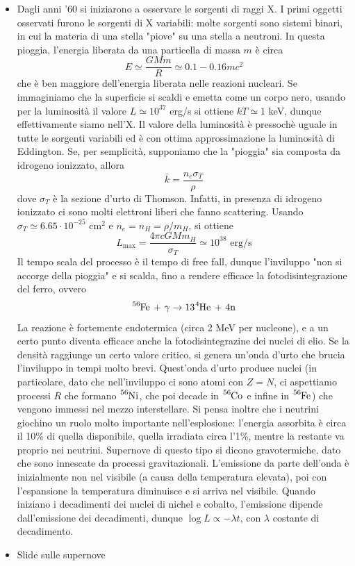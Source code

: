 \documentclass[a4paper,11pt]{article}
\theoremstyle{theorem}
\theoremstyle{definition}
\begin{document}
\begin{itemize}
		\item Dagli anni '60 si iniziarono a osservare le sorgenti di raggi X. I primi oggetti osservati furono le sorgenti di X variabili: molte sorgenti sono sistemi binari, in cui la materia di una stella "piove" su una stella a neutroni. In questa pioggia, l'energia liberata da una particella di massa $m$ è circa
		\[E\simeq\frac{GMm}{R}\simeq 0.1-0.16 mc^2\]
		che è ben maggiore dell'energia liberata nelle reazioni nucleari. Se immaginiamo che la superficie si scaldi e emetta come un corpo nero, usando per la luminosità il valore $L\simeq 10^{37}$ erg/s si ottiene $kT\simeq 1$ keV, dunque effettivamente siamo nell'X. Il valore della luminosità è pressochè uguale in tutte le sorgenti variabili ed è con ottima approssimazione la luminosità di Eddington. Se, per semplicità, supponiamo che la "pioggia" sia composta da idrogeno ionizzato, allora
		\[\bar{k}=\frac{n_e\sigma_T}{\rho}\]
		dove $\sigma_T$ è la sezione d'urto di Thomson. Infatti, in presenza di idrogeno ionizzato ci sono molti elettroni liberi che fanno scattering. Usando $\sigma_T\simeq6.65\cdot10^{-25}$ cm$^2$ e $n_e=n_H=\rho/m_H$, si ottiene
		\[L_\textrm{max}=\frac{4\pi cGMm_H}{\sigma_T}\simeq10^{38}\textrm{ erg/s}\]
		Il tempo scala del processo è il tempo di free fall, dunque l'inviluppo "non si accorge della pioggia" e si scalda, fino a rendere efficace la fotodisintegrazione del ferro, ovvero
		\[\tensor[^{56}]{\textrm{Fe}}{}\textrm{ + }\gamma\rightarrow13\tensor[^{4}]{\textrm{He}}{}\textrm{ + 4n}\]
		La reazione è fortemente endotermica (circa 2 MeV per nucleone), e a un certo punto diventa efficace anche la fotodisintegrazine dei nuclei di elio. Se la densità raggiunge un certo valore critico, si genera un'onda d'urto che brucia l'inviluppo in tempi molto brevi. Quest'onda d'urto produce nuclei (in particolare, dato che nell'inviluppo ci sono atomi con $Z=N$, ci aspettiamo processi $R$ che formano $\tensor[^{56}]{\textrm{Ni}}{}$, che poi decade in $\tensor[^{56}]{\textrm{Co}}{}$ e infine in $\tensor[^{56}]{\textrm{Fe}}{}$) che vengono immessi nel mezzo interstellare. Si pensa inoltre che i neutrini giochino un ruolo molto importante nell'esplosione: l'energia assorbita è circa il 10\% di quella disponibile, quella irradiata circa l'1\%, mentre la restante va proprio nei neutrini. Supernove di questo tipo si dicono gravotermiche, dato che sono innescate da processi gravitazionali. L'emissione da parte dell'onda è inizialmente non nel visibile (a causa della temperatura elevata), poi con l'espansione la temperatura diminuisce e si arriva nel visibile. Quando iniziano i decadimenti dei nuclei di nichel e cobalto, l'emissione dipende dall'emissione dei decadimenti, dunque $\log L\propto -\lambda t$, con $\lambda$ costante di decadimento.
		\item Slide sulle supernove
	\end{itemize}
\end{document}
